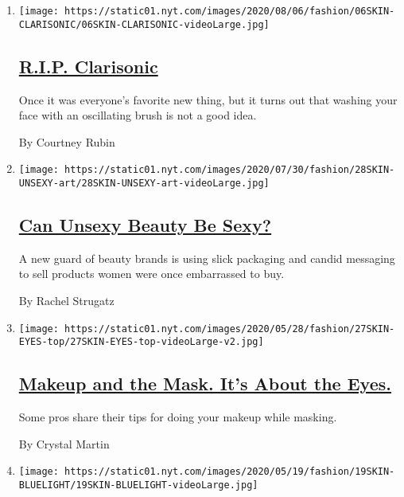 \begin{enumerate}
\def\labelenumi{\arabic{enumi}.}
\item
  \texttt{[image: https://static01.nyt.com/images/2020/08/06/fashion/06SKIN-CLARISONIC/06SKIN-CLARISONIC-videoLarge.jpg]}

  \hypertarget{rip-clarisonic}{%
  \subsection{\texorpdfstring{\href{/2020/08/05/style/skin-care-rip-clarisonic.html}{R.I.P.
  Clarisonic}}{R.I.P. Clarisonic}}\label{rip-clarisonic}}

  Once it was everyone's favorite new thing, but it turns out that
  washing your face with an oscillating brush is not a good idea.

  By Courtney Rubin
\item
  \texttt{[image: https://static01.nyt.com/images/2020/07/30/fashion/28SKIN-UNSEXY-art/28SKIN-UNSEXY-art-videoLarge.jpg]}

  \hypertarget{can-unsexy-beauty-be-sexy}{%
  \subsection{\texorpdfstring{\href{/2020/07/28/style/can-unsexy-beauty-be-sexy.html}{Can
  Unsexy Beauty Be
  Sexy?}}{Can Unsexy Beauty Be Sexy?}}\label{can-unsexy-beauty-be-sexy}}

  A new guard of beauty brands is using slick packaging and candid
  messaging to sell products women were once embarrassed to buy.

  By Rachel Strugatz
\item
  \texttt{[image: https://static01.nyt.com/images/2020/05/28/fashion/27SKIN-EYES-top/27SKIN-EYES-top-videoLarge-v2.jpg]}

  \hypertarget{makeup-and-the-mask-its-about-the-eyes}{%
  \subsection{\texorpdfstring{\href{/2020/05/26/style/makeup-and-the-mask-its-about-the-eyes.html}{Makeup
  and the Mask. It's About the
  Eyes.}}{Makeup and the Mask. It's About the Eyes.}}\label{makeup-and-the-mask-its-about-the-eyes}}

  Some pros share their tips for doing your makeup while masking.

  By Crystal Martin
\item
  \texttt{[image: https://static01.nyt.com/images/2020/05/19/fashion/19SKIN-BLUELIGHT/19SKIN-BLUELIGHT-videoLarge.jpg]}


\end{enumerate}

